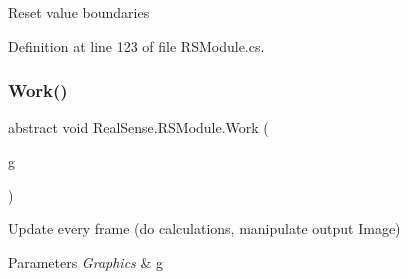 Reset value boundaries 

Definition at line 123 of file R\+S\+Module.\+cs.

\mbox{\label{class_real_sense_1_1_r_s_module_a2ec830b7932ee7c0077d473f81c73867}} 
\subsubsection{\texorpdfstring{Work()}{Work()}}
{\footnotesize\ttfamily abstract void Real\+Sense.\+R\+S\+Module.\+Work (\begin{DoxyParamCaption}\item[{Graphics}]{g }\end{DoxyParamCaption})\hspace{0.3cm}{\ttfamily [pure virtual]}}

Update every frame (do calculations, manipulate output Image) 
\begin{DoxyParams}{Parameters}
{\em Graphics} & g \\
\hline
\end{DoxyParams}


